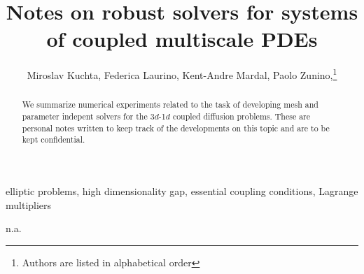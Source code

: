 \documentclass[r]{siamart171218}
\title{Notes on robust solvers for systems of coupled multiscale PDEs}
\author{
Miroslav Kuchta, Federica Laurino, Kent-Andre Mardal, Paolo Zunino,\thanks{Authors are listed in alphabetical order}
}
\begin{document}
\maketitle

\begin{abstract}
  We summarize numerical experiments related to the task of developing
  mesh and parameter indepent solvers for the 3$d$-1$d$ coupled diffusion problems.
  These are personal notes written to keep track of the developments on this
  topic and are to be kept confidential.
\end{abstract}

\begin{keywords}
elliptic problems, high dimensionality gap, essential coupling conditions, Lagrange multipliers
\end{keywords}

\begin{AMS}
n.a.
\end{AMS}

 
\newcommand{\semi}[1]{\lvert{#1}\rvert}
\newcommand{\norm}[1]{\lVert{#1}\rVert}
\newcommand{\jump}[1]{\ensuremath{[\![#1]\!]} }
\newcommand{\avg}[1]{\ensuremath{\left\{\!\left\{#1\right\}\!\right\}} }
\def\ud{u_{\odot}}
\def\vd{v_{\odot}}
\def\ld{\lambda_{\odot}}
\def\md{\mu_{\odot}}
\def\lld{l_{\odot}}
\def\uf{u_{\ominus}}
\def\up{u_{\oplus}}
\def\eps{\epsilon}
\def\nn{\boldsymbol n}
\def\rr{\boldsymbol r}
\def\RR{\boldsymbol R}
\def\kk{\boldsymbol k}
\def\ss{\boldsymbol s}
\def\uu{\boldsymbol u}
\def\vv{\boldsymbol v}
\def\xx{\boldsymbol x}
\def\bu{\overline{u}}
\def\bv{\overline{v}}
\def\tu{\widetilde{u}}
\def\tv{\widetilde{v}}
\def\TT{\boldsymbol T}
\def\NN{\boldsymbol N}
\def\BB{\boldsymbol B}
\def\ttu{\widetilde{\widetilde{u}}}
\def\ttv{\widetilde{\widetilde{v}}}
\def\cv{\check{v}}
\def\mesh{{\cal T}^h}
\def\ball{{\cal B}}
\def\R{\mathbb{R}}
\def\D{\mathcal{D}}
\def\DD{\partial\mathcal{D}}
\def\trace{{\mathcal{T}_\Gamma}}
\def\mtrace{{\overline{\mathcal{T}}_\Lambda}}
\def\ext{\mathcal{E}_\Gamma}
\def\ide{\mathcal{I}}
\def\ii{\hat{\imath}}
\newcommand{\avrd}[1]{\overline{\overline{#1}}}
\newcommand{\avrc}[1]{\overline{#1}}
\newcommand{\refe}[1]{{#1}_{\mathrm{ref}}}

\newcommand{\vertiii}[1]{{\left\vert\kern-0.25ex\left\vert\kern-0.25ex\left\vert #1 
    \right\vert\kern-0.25ex\right\vert\kern-0.25ex\right\vert}}
\end{document}
